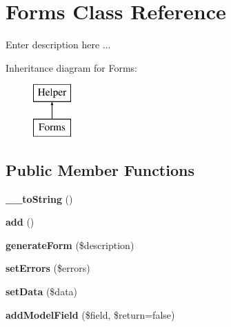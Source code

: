 \hypertarget{class_forms}{
\section{Forms Class Reference}
\label{class_forms}
}


Enter description here ...  


Inheritance diagram for Forms:\begin{figure}[H]
\begin{center}
\leavevmode
\includegraphics[height=2.000000cm]{class_forms}
\end{center}
\end{figure}
\subsection*{Public Member Functions}
\begin{DoxyCompactItemize}
\item 
\hypertarget{class_forms_a9fd08ffa91923d27eec499c46a4691e9}{
{\bfseries \_\-\_\-toString} ()}
\label{class_forms_a9fd08ffa91923d27eec499c46a4691e9}

\item 
\hypertarget{class_forms_a27152edbdd680599ac2865d034cbb7b0}{
{\bfseries add} ()}
\label{class_forms_a27152edbdd680599ac2865d034cbb7b0}

\item 
\hypertarget{class_forms_ace808c01f93f783b0085198c2bb857a0}{
{\bfseries generateForm} (\$description)}
\label{class_forms_ace808c01f93f783b0085198c2bb857a0}

\item 
\hypertarget{class_forms_afd7c2e9945103f26830c8543d534be9d}{
{\bfseries setErrors} (\$errors)}
\label{class_forms_afd7c2e9945103f26830c8543d534be9d}

\item 
\hypertarget{class_forms_af44d1c4d6498f281548cb28939a03324}{
{\bfseries setData} (\$data)}
\label{class_forms_af44d1c4d6498f281548cb28939a03324}

\item 
\hypertarget{class_forms_a465291db7d902c37ffdb2b8287b496b4}{
{\bfseries addModelField} (\$field, \$return=false)}
\label{class_forms_a465291db7d902c37ffdb2b8287b496b4}

\end{DoxyCompactItemize}
